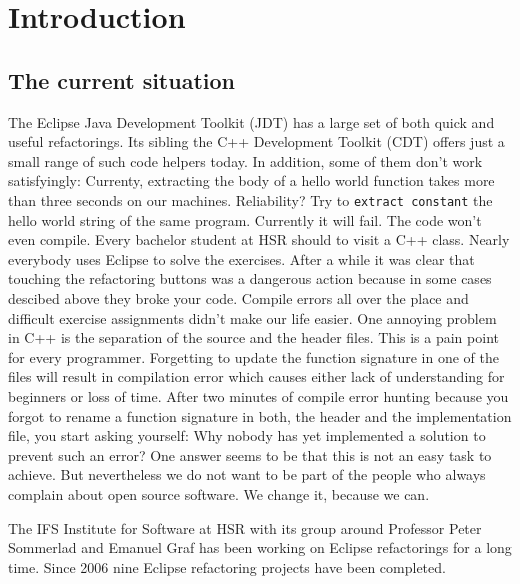 \chapter{Introduction}
\thispagestyle{fancy}

\section{The current situation}

The Eclipse Java Development Toolkit (JDT) has a large set of both quick and
useful refactorings. Its sibling the C++ Development Toolkit (CDT) offers just a
small range of such code helpers today. In addition, some of them don't work
satisfyingly: Currenty, extracting the body of a hello world function takes more
than three seconds on our machines. Reliability? Try to \texttt{extract
constant} the hello world string of the same program. Currently it will fail.
The code won't even compile.\newline
Every bachelor student at HSR should to visit a C++ class. Nearly
everybody uses Eclipse to solve the exercises. After a while it was clear that
touching the refactoring buttons was a dangerous action because in some cases
descibed above they broke your code. Compile errors all over the place and
difficult exercise assignments didn't make our life easier.\newline
One annoying problem in C++ is the separation of the source and the header
files. This is a pain point for every programmer. Forgetting to update the
function signature in one of the files will result in compilation error which
causes either lack of understanding for beginners or loss of time.\newline
After two minutes of compile error hunting because you forgot to rename a
function signature in both, the header and the implementation file, you start
asking yourself: Why nobody has yet implemented a solution to prevent such an
error?\newline
One answer seems to be that this is not an easy task to achieve. But
nevertheless we do not want to be part of the people who always complain about
open source software. We change it, because we can. \newline
 
The IFS Institute for Software at HSR with its group around Professor Peter
Sommerlad and
Emanuel Graf has been working on Eclipse refactorings for a long time. Since
2006 nine Eclipse refactoring projects have been completed.\newline

